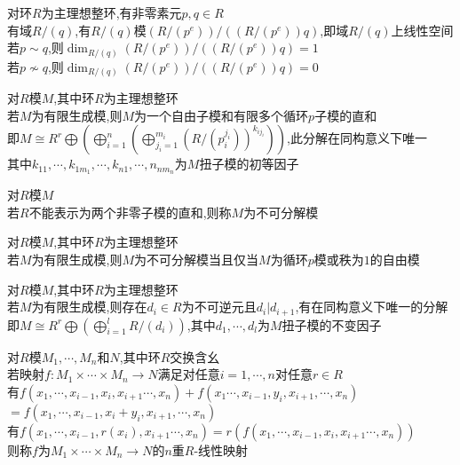 \begin{dingli}
对环$R$为主理想整环,有非零素元$p,q\in R$\\
有域$R/(q)$,有$R/(q)$模$(R/(p^e))/((R/(p^e))q)$,即域$R/(q)$上线性空间\\
若$p\sim q$,则$\dim_{R/(q)}(R/(p^e))/((R/(p^e))q)=1$\\
若$p\not\sim q$,则$\dim_{R/(q)}(R/(p^e))/((R/(p^e))q)=0$
\end{dingli}

\begin{dingli}
对$R$模$M$,其中环$R$为主理想整环\\
若$M$为有限生成模,则$M$为一个自由子模和有限多个循环$p$子模的直和\\
即$M\cong R^r\bigoplus(\bigoplus\limits_{i=1}^{n}(\bigoplus\limits_{j_i=1}^{m_i}(R/(p_i^{j_i}))^{k_{ij_i}}))$,此分解在同构意义下唯一\\
其中$k_{11},\cdots,k_{1m_1},\cdots,k_{n1},\cdots,n_{nm_n}$为$M$扭子模的初等因子
\end{dingli}

\begin{dingyi}
对$R$模$M$\\
若$R$不能表示为两个非零子模的直和,则称$M$为不可分解模
\end{dingyi}

\begin{dingli}
对$R$模$M$,其中环$R$为主理想整环\\
若$M$为有限生成模,则$M$为不可分解模当且仅当$M$为循环$p$模或秩为$1$的自由模
\end{dingli}

\begin{dingli}
对$R$模$M$,其中环$R$为主理想整环\\
若$M$为有限生成模,则存在$d_i\in R$为不可逆元且$d_i|d_{i+1}$,有在同构意义下唯一的分解\\
即$M\cong R^r\bigoplus(\bigoplus\limits_{i=1}^{l}R/(d_i))$,其中$d_1,\cdots,d_l$为$M$扭子模的不变因子  
\end{dingli}

\begin{dingyi}
对$R$模$M_1,\cdots,M_n$和$N$,其中环$R$交换含幺\\
若映射$f:M_1\times\cdots\times M_n\to N$满足对任意$i=1,\cdots,n$对任意$r\in R$\\
有$f(x_1,\cdots,x_{i-1},x_i,x_{i+1}\cdots,x_n)+f(x_1\cdots,x_{i-1},y_i,x_{i+1},\cdots,x_n)$\\
$=f(x_1,\cdots,x_{i-1},x_i+y_i,x_{i+1},\cdots,x_n)$\\
有$f(x_1,\cdots,x_{i-1},r(x_i),x_{i+1}\cdots,x_n)=r(f(x_1,\cdots,x_{i-1},x_i,x_{i+1}\cdots,x_n))$\\
则称$f$为$M_1\times\cdots\times M_n\to N$的$n$重$R$-线性映射
\end{dingyi}

